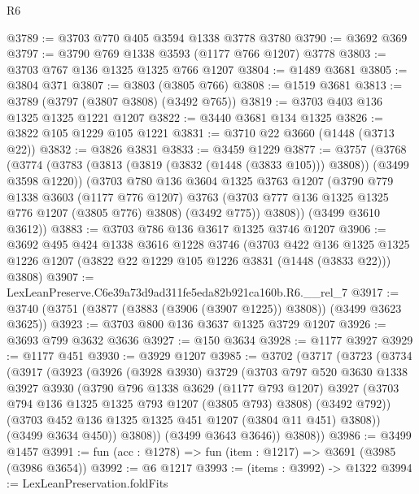 \begin{lexlean}{R6}
\begin{coremodule}
@3789 := @3703 @770 @405 @3594 @1338 @3778 @3780
@3790 := @3692 @369
@3797 := @3790 @769 @1338 @3593 (@1177 @766 @1207) @3778
@3803 := @3703 @767 @136 @1325 @1325 @766 @1207
@3804 := @1489 @3681
@3805 := @3804 @371
@3807 := @3803 (@3805 @766)
@3808 := @1519 @3681
@3813 := @3789 (@3797 (@3807 @3808) (@3492 @765))
@3819 := @3703 @403 @136 @1325 @1325 @1221 @1207
@3822 := @3440 @3681 @134 @1325
@3826 := @3822 @105 @1229 @105 @1221
@3831 := @3710 @22 @3660 (@1448 (@3713 @22))
@3832 := @3826 @3831
@3833 := @3459 @1229
@3877 := @3757
    (@3768
      (@3774
        (@3783 (@3813 (@3819 (@3832 (@1448 (@3833 @105))) @3808)) (@3499 @3598 @1220))
        (@3703
          @780
          @136
          @3604
          @1325
          @3763
          @1207
          (@3790
            @779
            @1338
            @3603
            (@1177 @776 @1207)
            @3763
            (@3703 @777 @136 @1325 @1325 @776 @1207 (@3805 @776) @3808)
            (@3492 @775))
          @3808))
      (@3499 @3610 @3612))
@3883 := @3703 @786 @136 @3617 @1325 @3746 @1207
@3906 := @3692
    @495
    @424
    @1338
    @3616
    @1228
    @3746
    (@3703
      @422
      @136
      @1325
      @1325
      @1226
      @1207
      (@3822 @22 @1229 @105 @1226 @3831 (@1448 (@3833 @22)))
      @3808)
@3907 := LexLeanPreserve.C6e39a73d9ad311fe5eda82b921ca160b.R6.__rel_7
@3917 := @3740 (@3751 (@3877 (@3883 (@3906 (@3907 @1225)) @3808)) (@3499 @3623 @3625))
@3923 := @3703 @800 @136 @3637 @1325 @3729 @1207
@3926 := @3693 @799 @3632 @3636
@3927 := @150 @3634
@3928 := @1177 @3927
@3929 := @1177 @451
@3930 := @3929 @1207
@3985 := @3702
    (@3717
      (@3723
        (@3734
          (@3917
            (@3923
              (@3926
                (@3928 @3930)
                @3729
                (@3703
                  @797
                  @520
                  @3630
                  @1338
                  @3927
                  @3930
                  (@3790
                    @796
                    @1338
                    @3629
                    (@1177 @793 @1207)
                    @3927
                    (@3703 @794 @136 @1325 @1325 @793 @1207 (@3805 @793) @3808)
                    (@3492 @792))
                  (@3703 @452 @136 @1325 @1325 @451 @1207 (@3804 @11 @451) @3808))
                (@3499 @3634 @450))
              @3808))
          (@3499 @3643 @3646))
        @3808))
@3986 := @3499 @1457
@3991 := fun (acc : @1278) => fun (item : @1217) => @3691 (@3985 (@3986 @3654))
@3992 := @6 @1217
@3993 := (items : @3992) -> @1322
@3994 := LexLeanPreservation.foldFits

\end{coremodule}
\end{lexlean}
